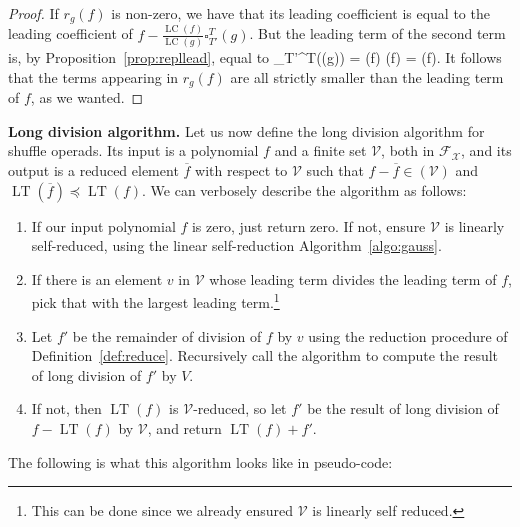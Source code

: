 \documentclass[fleqn, a4paper, twoside]{article}
\makeatletter
\newcommand{\lead}[1]{\operatorname{LT}(#1)}
\newcommand{\leadm}[1]{\operatorname{LM}(#1)}
\newcommand{\repl}[3]{\square_{#1}^{#2}(#3)}
\newcommand{\leadc}[1]{\operatorname{LC}(#1)}
\newcommand{\0}{\langle 0\rangle}
\newcommand{\XX}{\mathcal{X}}
\newcommand{\FF}{\mathcal{F}}
\newenvironment{tenumerate}{
 \begin{enumerate}
  \setlength{\itemsep}{0pt}
  \setlength{\parskip}{0pt}
}{\end{enumerate}}
\let\[\@undefined
\DeclareRobustCommand{\[}{\begin{equation}}%
\let\]\@undefined
\DeclareRobustCommand{\]}{\end{equation}}%
\theoremstyle{mytheorem}
\theoremstyle{introthm}
\theoremstyle{mydefinition}
\theoremstyle{mydefinition2}
\theoremstyle{plain} %
\newcommand{\?}{\,?\,}
\theoremstyle{mytheorem}
\theoremstyle{plain} %
\makeatother
\begin{document}
\begin{proof}
If $r_g(f)$ is non-zero, we have that its leading coefficient is 
equal to the leading coefficient of $f- \frac{\leadc{f}}{\leadc{g}}\repl{T'}{T}{g}$. But the leading term of the second term is, by
Proposition~\ref{prop:repllead}, equal to 
\[ \frac{\leadc{f}}{\leadc{g}}\repl{T'}{T}{\lead{g}} =  \leadc{f} \leadm{f} 
	= \lead{f}.\]
It follows that the terms appearing in $r_g(f)$ are all strictly smaller
than the leading term of $f$, as we wanted. 
\end{proof}

\textbf{Long division algorithm.}
Let us now define the long division algorithm for shuffle operads.
Its input is a polynomial $f$ and a finite set $\mathcal V$, both
in $\FF_\XX$, and its
output is a reduced element $\overline{f}$ with respect to $\mathcal
V$ such that $f-\overline{f} \in (\mathcal V)$ and $\lead{\overline{f}}
\preceq \lead{f}$. We can verbosely describe the algorithm as follows: 
\begin{tenumerate}
\item If our input polynomial
$f$ is zero, just return zero. If not, ensure $\mathcal V$
is linearly self-reduced, using the linear self-reduction
Algorithm~\ref{algo:gauss}.
\item If there is an element $v$ in $\mathcal V$ 
whose leading term divides the
leading term of $f$, pick that with the largest leading term.\footnote{This
 can be done since we already ensured $\mathcal V$ is linearly
self reduced.}
\item Let $f'$ be the remainder of division of $f$
by $v$ using the reduction procedure of Definition~\ref{def:reduce}.
Recursively call the algorithm to compute the result of long
division of $f'$ by $V$.
\item If not, then $\lead{f}$ is $\mathcal V$-reduced, 
so let $f'$ be the result of long division of $f-\lead{f}$ by $\mathcal V$, and return $\lead{f} + f'$.
\end{tenumerate}
The following is what this algorithm looks like in pseudo-code:
\end{document}

